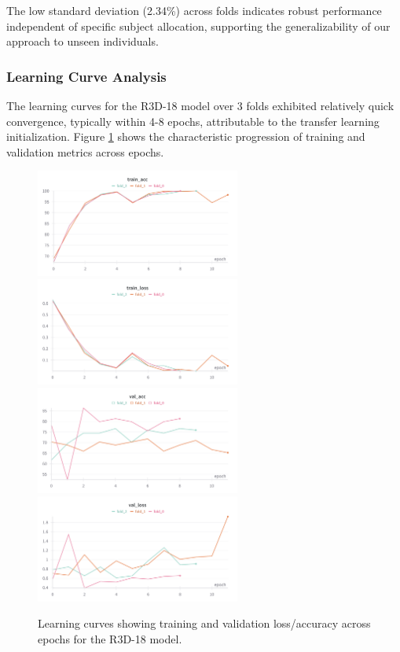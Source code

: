 \documentclass[12pt, a4paper]{article}
\begin{document}
The low standard deviation (2.34\%) across folds indicates robust performance independent of specific subject allocation, supporting the generalizability of our approach to unseen individuals.

\subsubsection{Learning Curve Analysis}

The learning curves for the R3D-18 model over 3 folds exhibited relatively quick convergence, typically within 4-8 epochs, attributable to the transfer learning initialization. Figure \ref{fig:learning_curves} shows the characteristic progression of training and validation metrics across epochs.

\begin{figure}[htbp]
  \centering
  \includegraphics[width=0.6\textwidth]{figures/3f_train_acc.png}
  \includegraphics[width=0.6\textwidth]{figures/3f_train_loss.png}
  \includegraphics[width=0.6\textwidth]{figures/3f_val_acc.png}
  \includegraphics[width=0.6\textwidth]{figures/3f_val_loss.png}
  \caption{Learning curves showing training and validation loss/accuracy across epochs for the R3D-18 model.}
  \label{fig:learning_curves}
\end{figure}
\end{document}
